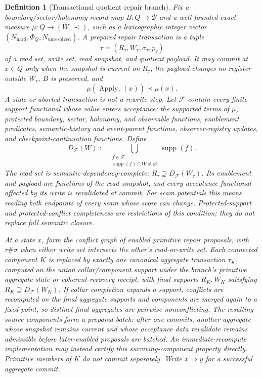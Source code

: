 \documentclass[11pt]{article}
\newtheorem{definition}[theorem]{Definition}
\begin{document}
\begin{definition}[Transactional quotient repair branch]\label{def:transactional-quotient-repair}
Fix a boundary/sector/holonomy record map \(B:Q\to\mathcal B\) and a well-founded exact measure
\(\mu:Q\to(W,\prec)\), such as a lexicographic integer vector
\((N_{\mathrm{hard}},\Phi_Q,N_{\mathrm{unresolved}})\). A prepared repair transaction is a tuple
\[
\tau=(R_\tau,W_\tau,\sigma_\tau,p_\tau)
\]
of a read set, write set, read snapshot, and quotient payload. It may commit at \(x\in Q\) only
when the snapshot is current on \(R_\tau\), the payload changes no register outside \(W_\tau\),
\(B\) is preserved, and
\[
\mu(\operatorname{Apply}_\tau(x))\prec\mu(x).
\]
A stale or aborted transaction is not a rewrite step. Let \(\mathcal F\) contain every
finite-support functional whose value enters acceptance: the supported terms of \(\mu\), protected
boundary, sector, holonomy, and observable functions, enablement predicates, semantic-history and
event-parent functions, observer-registry updates, and checkpoint-continuation functions. Define
\[
D_{\mathcal F}(W)
:=
\bigcup_{\substack{f\in\mathcal F\\
\operatorname{supp}(f)\cap W\ne\varnothing}}
\operatorname{supp}(f).
\]
The read set is semantic-dependency-complete:
\(R_\tau\supseteq D_{\mathcal F}(W_\tau)\). Its enablement and payload are functions of the read
snapshot, and every acceptance functional affected by its write is revalidated at commit. For
seam potentials this means reading both endpoints of every seam whose score can change.
Protected-support and protected-conflict completeness are restrictions of this condition; they
do not replace full semantic closure.

At a state \(x\), form the conflict graph of enabled primitive repair proposals, with
\(\tau\#\sigma\) when either write set intersects the other's read-or-write set. Each connected
component \(K\) is replaced by exactly one canonical aggregate transaction \(\tau_K\), computed on
the union collar/component support under the branch's primitive aggregate-state or coherent-recovery
receipt, with final supports \(R_K,W_K\) satisfying
\(R_K\supseteq D_{\mathcal F}(W_K)\). If collar completion expands a support,
conflicts are recomputed on the final aggregate supports and components are merged again to a
fixed point, so distinct final aggregates are pairwise nonconflicting. The resulting source
components form a prepared batch: after one commits, another aggregate whose snapshot remains
current and whose acceptance data revalidate remains admissible before later-enabled proposals
are batched. An immediate-recompute implementation may instead certify this
surviving-component property directly. Primitive members of \(K\) do not commit separately. Write
\(x\Rightarrow y\) for a successful aggregate commit.
\end{definition}
\end{document}
